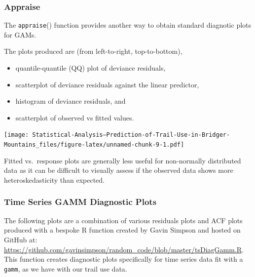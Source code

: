 \documentclass[
]{book}
\newenvironment{Shaded}{\begin{snugshade}}{\end{snugshade}}
\newcommand{\CommentTok}[1]{\textcolor[rgb]{0.56,0.35,0.01}{\textit{#1}}}
\newcommand{\FunctionTok}[1]{\textcolor[rgb]{0.00,0.00,0.00}{#1}}
\newcommand{\NormalTok}[1]{#1}
\newcommand{\SpecialCharTok}[1]{\textcolor[rgb]{0.00,0.00,0.00}{#1}}
\providecommand{\tightlist}{%
  \setlength{\itemsep}{0pt}\setlength{\parskip}{0pt}}
\begin{document}
\hypertarget{appraise}{%
\subsubsection{Appraise}\label{appraise}}

The \texttt{appraise}() function provides another way to obtain standard diagnotic plots for GAMs.

The plots produced are (from left-to-right, top-to-bottom),

\begin{itemize}
\tightlist
\item
  quantile-quantile (QQ) plot of deviance residuals,
\item
  scatterplot of deviance residuals against the linear predictor,
\item
  histogram of deviance residuals, and
\item
  scatterplot of observed vs fitted values.
\end{itemize}

\begin{Shaded}
\end{Shaded}

\texttt{[image: Statistical-Analysis--Prediction-of-Trail-Use-in-Bridger-Mountains\_files/figure-latex/unnamed-chunk-9-1.pdf]}

Fitted vs.~response plots are generally less useful for non-normally distributed data as it can be difficult to visually assess if the observed data shows more heteroskedasticity than expected.

\hypertarget{time-series-gamm-diagnostic-plots}{%
\subsubsection{Time Series GAMM Diagnostic Plots}\label{time-series-gamm-diagnostic-plots}}

The following plots are a combination of various residuals plots and ACF plots produced with a bespoke R function created by Gavin Simpson and hosted on GitHub at: \url{https://github.com/gavinsimpson/random_code/blob/master/tsDiagGamm.R}. This function creates diagnostic plots specifically for time series data fit with a \texttt{gamm}, as we have with our trail use data.
\end{document}
